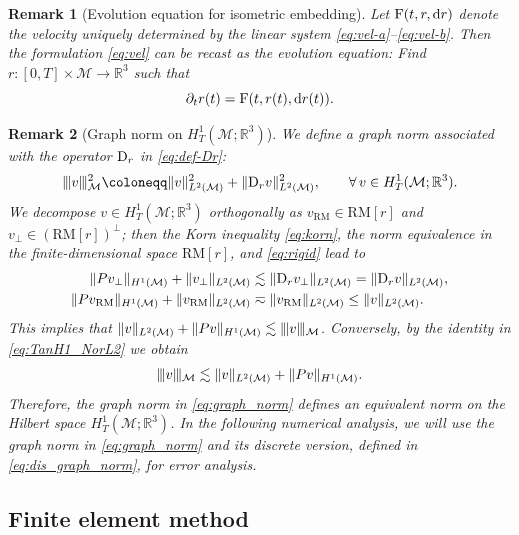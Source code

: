 \documentclass[11pt,a4paper,oneside,reqno]{amsart}
\theoremstyle{definition}
\theoremstyle{plain}
\newtheorem{remark}{Remark}[section]
\numberwithin{theorem}{section}
\numberwithin{proposition}{section}
\numberwithin{lemma}{section}
\numberwithin{equation}{section}
\newcommand{\Man}{\mathcal{M}}
\newcommand{\RM}{\mathrm{RM}}
\newcommand{\normt}[1]{%
	\vert\kern-0.9pt\vert\kern-0.9pt\vert #1
	\vert\kern-0.9pt\vert\kern-0.9pt\vert}
\begin{document}
\smallskip

\begin{remark} [Evolution equation for isometric embedding]
    \upshape
    Let \({\rm F}(t, r, \mathrm{d}r)\) denote the velocity uniquely determined by the linear system \eqref{eq:vel-a}–\eqref{eq:vel-b}. Then the formulation \eqref{eq:vel} can be recast as the evolution equation: Find \(r:[0,T]\times\Man\to\mathbb{R}^3\) such that
  \[\partial_t r(t) = {\rm F}(t, r(t), \mathrm{d}r(t)).\] 
\end{remark}  



\begin{remark} [Graph norm on $H^1_T(\Man; \mathbb{R}^3)$]
    \upshape 
    We define a graph norm associated with the operator \({\rm D}_r\) in \eqref{eq:def-Dr}:
    \begin{equation}\label{eq:graph_norm}
        \normt{v}_{\Man}^2
        \coloneqq \|v\|_{L^2(\Man)}^2 + \| {\rm D}_r v \|_{L^2(\Man)}^2,
        \qquad \forall\, v \in H^1_{T}(\Man; \mathbb{R}^3).
    \end{equation}
    We decompose \(v \in H^1_{T}(\Man; \mathbb{R}^3)\) orthogonally as \(v_{\RM} \in \RM[r]\) and \(v_{\perp} \in (\RM[r])^{\perp}\); then the Korn inequality \eqref{eq:korn}, the norm equivalence in the finite-dimensional space \(\RM[r]\), and \eqref{eq:rigid} lead to 
    \[
    \begin{aligned}
        \| P v_{\perp} \|_{H^1(\Man)} + \| v_{\perp} \|_{L^2(\Man)}
        &\lesssim \| {\rm D}_r v_{\perp} \|_{L^2(\Man)} =  \| {\rm D}_r v \|_{L^2(\Man)}, \\ 
        \| P v_{\RM} \|_{H^1(\Man)} + \| v_{\RM} \|_{L^2(\Man)} 
        &\eqsim \| v_{\RM} \|_{L^2(\Man)} \le \| v \|_{L^2(\Man)}. 
    \end{aligned}
    \]
    This implies that \( \| v \|_{L^2(\Man)} + \|Pv\|_{H^1(\Man)} \lesssim  \normt{ v }_{\Man} \).
    Conversely, by the identity in \eqref{eq:TanH1_NorL2} we obtain
    \[
    \normt{ v }_{\Man} \lesssim \| v \|_{L^2(\Man)} + \|Pv\|_{H^1(\Man)}.
    \]
  Therefore, the graph norm in \eqref{eq:graph_norm} defines an equivalent norm on the Hilbert space \(H^1_{T}(\Man; \mathbb{R}^3)\).
In the following numerical analysis, we will use the graph norm in \eqref{eq:graph_norm} and its discrete version, defined in \eqref{eq:dis_graph_norm}, for error analysis.    
\end{remark}


\subsection{Finite element method}
\end{document}
